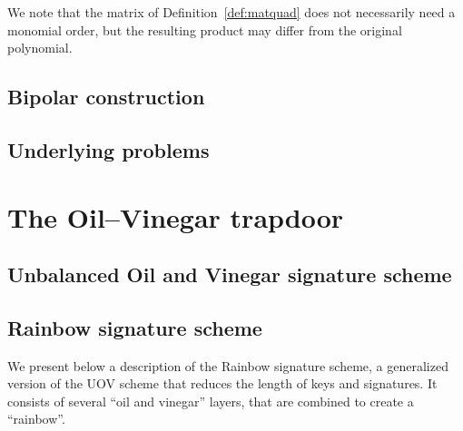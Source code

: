 \documentclass[draft, 12pt, a4paper, oneside]{memoir}
\theoremstyle{definition}
\begin{document}
We note that the matrix of Definition~\ref{def:matquad} does not necessarily need a monomial order, but the resulting product may differ from the original polynomial.

\subsection{Bipolar construction}\label{subsec:bipolar}

\subsection{Underlying problems}



\section{The Oil--Vinegar trapdoor}\label{sec:ov}

\subsection{Unbalanced Oil and Vinegar signature scheme}


\subsection{Rainbow signature scheme}\label{subsec:rainbow}

We present below a description of the Rainbow signature scheme, a
generalized version of the UOV scheme that reduces the length of keys and
signatures. It consists of several ``oil and vinegar'' layers, that are
combined to create a ``rainbow''. 
\end{document}
